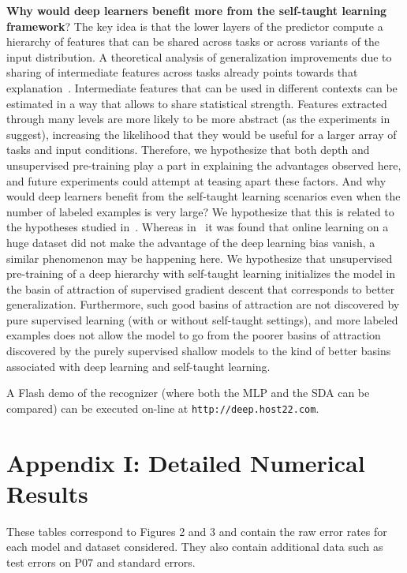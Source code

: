 \documentclass{article} %
\begin{document}
{\bf Why would deep learners benefit more from the self-taught learning framework}?
The key idea is that the lower layers of the predictor compute a hierarchy
of features that can be shared across tasks or across variants of the
input distribution. A theoretical analysis of generalization improvements
due to sharing of intermediate features across tasks already points
towards that explanation~\cite{baxter95a}.
Intermediate features that can be used in different
contexts can be estimated in a way that allows to share statistical 
strength. Features extracted through many levels are more likely to
be more abstract (as the experiments in~\citet{Goodfellow2009} suggest),
increasing the likelihood that they would be useful for a larger array
of tasks and input conditions.
Therefore, we hypothesize that both depth and unsupervised
pre-training play a part in explaining the advantages observed here, and future
experiments could attempt at teasing apart these factors.
And why would deep learners benefit from the self-taught learning
scenarios even when the number of labeled examples is very large?
We hypothesize that this is related to the hypotheses studied
in~\citet{Erhan+al-2010}. Whereas in~\citet{Erhan+al-2010}
it was found that online learning on a huge dataset did not make the
advantage of the deep learning bias vanish, a similar phenomenon
may be happening here. We hypothesize that unsupervised pre-training
of a deep hierarchy with self-taught learning initializes the
model in the basin of attraction of supervised gradient descent
that corresponds to better generalization. Furthermore, such good
basins of attraction are not discovered by pure supervised learning
(with or without self-taught settings), and more labeled examples
does not allow the model to go from the poorer basins of attraction discovered
by the purely supervised shallow models to the kind of better basins associated
with deep learning and self-taught learning.

A Flash demo of the recognizer (where both the MLP and the SDA can be compared) 
can be executed on-line at {\tt http://deep.host22.com}.


\section*{Appendix I: Detailed Numerical Results}

These tables correspond to Figures 2 and 3 and contain the raw error rates for each model and dataset considered.
They also contain additional data such as test errors on P07 and standard errors.
\end{document}
